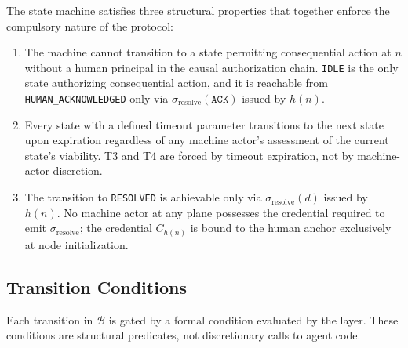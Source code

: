 The state machine satisfies three structural properties that together enforce the compulsory nature of the protocol:

\begin{enumerate}\itemsep=0pt
\item[\textbf{(SP-1) Non-regression.}] The machine cannot transition to a state permitting consequential action at $n$ without a human principal in the causal authorization chain. \texttt{IDLE} is the only state authorizing consequential action, and it is reachable from \texttt{HUMAN\_ACKNOWLEDGED} only via $\sigma_{\text{resolve}}(\texttt{ACK})$ issued by $h(n)$.

\item[\textbf{(SP-2) Timeout-forced progression.}] Every state with a defined timeout parameter transitions to the next state upon expiration regardless of any machine actor's assessment of the current state's viability. T3 and T4 are forced by timeout expiration, not by machine-actor discretion.

\item[\textbf{(SP-3) Human-only resolution.}] The transition to \texttt{RESOLVED} is achievable only via $\sigma_{\text{resolve}}(d)$ issued by $h(n)$. No machine actor at any plane possesses the credential required to emit $\sigma_{\text{resolve}}$; the credential $C_{h(n)}$ is bound to the human anchor exclusively at node initialization.
\end{enumerate}

\subsection{Transition Conditions}
\label{sec:bp-transitions-conditions}

Each transition in $\mathcal{B}$ is gated by a formal condition evaluated by the \fact{} layer. These conditions are structural predicates, not discretionary calls to agent code.

